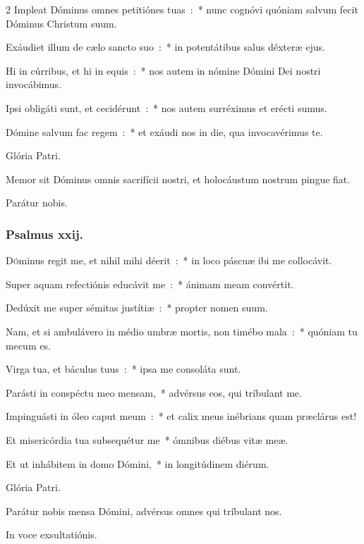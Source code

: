\documentclass[9pt,twoside]{extarticle}
\begin{document}
\begin{multicols}{2}
Impleat Dóminus omnes petitiónes tuas~:~* nunc cognóvi quóniam salvum fecit Dóminus Christum suum.

Exáudiet illum de cælo sancto suo~:~* in potentátibus salus déxteræ ejus.

Hi in cúrribus, et hi in equis~:~* nos autem in nómine Dómini Dei nostri invocábimus.

Ipsi obligáti sunt, et cecidérunt~:~* nos autem surréximus et erécti sumus.

Dómine salvum fac regem~:~* et exáudi nos in die, qua invocavérimus te.

Glória Patri.

\begin{tightlist}{}
\item {} Memor sit Dóminus omnis sacrifícii nostri, et holocáustum nostrum pingue fiat.
\item {} Parátur nobis.
\end{tightlist}

\subsubsection*{\center Psalmus xxij.}
\lettrine{D}óminus regit me, et nihil mihi déerit~:~* in loco páscuæ ibi me collocávit.

Super aquam refectiónis educávit me~:~* ánimam meam convértit.

Dedúxit me super sémitas justítiæ~:~* propter nomen suum.

Nam, et si ambulávero in médio umbræ mortis, non timébo mala~:~* quóniam tu mecum es.

Virga tua, et báculus tuus~:~* ipsa me consoláta sunt.

Parásti in conspéctu meo mensam,~* advérsus eos, qui tríbulant me.

Impinguásti in óleo caput meum~:~* et calix meus inébrians quam præclárus est!

Et misericórdia tua subsequétur me~* ómnibus diébus vitæ meæ.

Et ut inhábitem in domo Dómini,~* in longitúdinem diérum.

Glória Patri.

\begin{tightlist}{}
\item {} Parátur nobis mensa Dómini, advérsus omnes qui tríbulant nos.
\item {} In voce exsultatiónis.
\end{tightlist}


\end{multicols}
\end{document}
